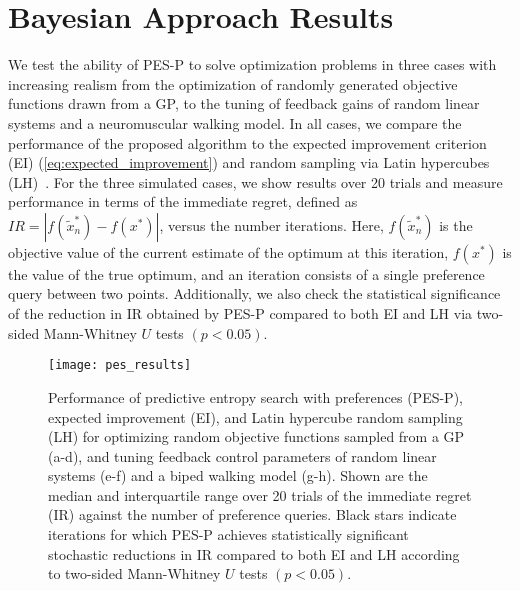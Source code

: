 \section{Bayesian Approach Results}\label{s:results}
We test the ability of PES-P to solve optimization problems in three cases with
increasing realism from the optimization of randomly generated objective
functions drawn from a GP, to the tuning of feedback gains of random linear
systems and a neuromuscular walking model. In all cases, we compare the
performance of the proposed algorithm to the expected improvement criterion (EI)
(\cref{eq:expected_improvement}) and random sampling via Latin hypercubes
(LH)~\citep{mckay2000comparison}. For the three simulated cases, we show
results over 20 trials and measure performance in terms of the immediate regret,
defined as $IR = |f(\tilde x_n^*) - f(x^*)|$, versus the number iterations.
Here, $f(\tilde x_n^*)$ is the objective value of the current estimate of the
optimum at this iteration, $f(x^*)$ is the value of the true optimum, and an
iteration consists of a single preference query between two points.
Additionally, we also check the statistical significance of the reduction in IR
obtained by PES-P compared to both EI and LH via two-sided Mann-Whitney $U$
tests $(p < 0.05)$.

\begin{figure*}[t!]
    \centering
    \texttt{[image: pes\_results]}
    \caption{Performance of predictive entropy search with preferences (PES-P),
    expected improvement (EI), and Latin hypercube random sampling (LH) for
    optimizing random objective functions sampled from a GP (a-d), and tuning
    feedback control parameters of random linear systems (e-f) and a biped
    walking model (g-h). Shown are the median and interquartile range over 20
    trials of the immediate regret (IR) against the number of preference
    queries. Black stars indicate iterations for which PES-P achieves
    statistically significant stochastic reductions in IR compared to both EI
    and LH according to two-sided Mann-Whitney $U$ tests $(p <
    0.05)$.}\label{fig:y_err_sim}
\end{figure*}

